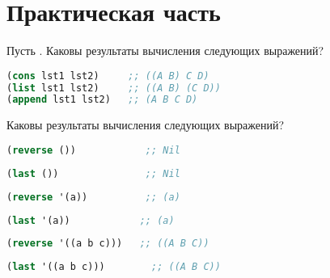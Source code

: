 \documentclass[a4paper,oneside,12pt]{extreport}
\begin{document}


\section*{Практическая часть}

\begin{task}
    Пусть .
    Каковы результаты вычисления следующих выражений?
    \begin{lstlisting}[language=Lisp]
(cons lst1 lst2)     ;; ((A B) C D)
(list lst1 lst2)     ;; ((A B) (C D))
(append lst1 lst2)   ;; (A B C D)
    \end{lstlisting}


\end{task}

\begin{task}
    Каковы результаты вычисления следующих выражений?

    \begin{lstlisting}[language=Lisp]
(reverse ())            ;; Nil
    \end{lstlisting}

    \begin{lstlisting}[language=Lisp]
(last ())               ;; Nil
    \end{lstlisting}

    \begin{lstlisting}[language=Lisp]
(reverse '(a))          ;; (a)
    \end{lstlisting}

    \vspace*{4.5em plus .6em minus .5em}

    \begin{lstlisting}[language=Lisp]
(last '(a))            ;; (a)
    \end{lstlisting}

    \begin{lstlisting}[language=Lisp]
(reverse '((a b c)))   ;; ((A B C))
    \end{lstlisting}

    \vspace*{4.5em plus .6em minus .5em}

    \begin{lstlisting}[language=Lisp]
(last '((a b c)))        ;; ((A B C))
    \end{lstlisting}


\end{task}
\end{document}
